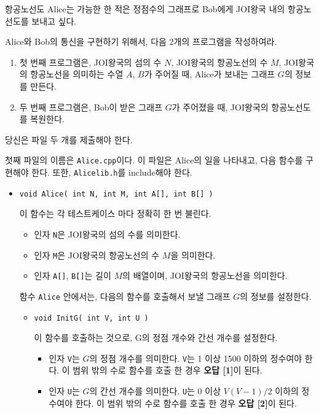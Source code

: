\begin{problem}{항공노선도}
	Alice는 가능한 한 적은 정점수의 그래프로 Bob에게 JOI왕국 내의 항공노선도를 보내고 싶다.
	
	Alice와 Bob의 통신을 구현하기 위해서, 다음 2개의 프로그램을 작성하여라.
	
	\begin{enumerate}
		\item 첫 번째 프로그램은, JOI왕국의 섬의 수 $N$, JOI왕국의 항공노선의 수 $M$, JOI왕국의 항공노선을 의미하는 수열 $A$, $B$가 주어질 때, Alice가 보내는 그래프 $G$의 정보를 만든다.
		\item 두 번째 프로그램은, Bob이 받은 그래프 $G$가 주어졌을 때, JOI왕국의 항공노선도를 복원한다. 
	\end{enumerate}

\Specification

당신은 파일 두 개를 제출해야 한다.

첫째 파일의 이름은 \texttt{Alice.cpp}이다. 이 파일은 Alice의 일을 나타내고, 다음 함수를 구현해야 한다. 또한, \texttt{Alicelib.h}를 include해야 한다.

\begin{itemize}
	\item \texttt{void Alice( int N, int M, int A[], int B[] )}
	
	이 함수는 각 테스트케이스 마다 정확히 한 번 불린다.
	
	\begin{itemize}
		\item 인자 \texttt{N}은 JOI왕국의 섬의 수를 의미한다.
		\item 인자 \texttt{M}은 JOI왕국의 항공노선의 수 $M$을 의미한다.
		\item 인자 \texttt{A[]}, \texttt{B[]}는 길이 $M$의 배열이며, JOI왕국의 항공노선을 의미한다.
	\end{itemize}
	
	함수 \texttt{Alice} 안에서는, 다음의 함수를 호출해서 보낼 그래프 $G$의 정보를 설정한다.
	\begin{itemize}
	\item \texttt{void InitG( int V, int U )}
	
	이 함수를 호출하는 것으로, G의 정점 개수와 간선 개수를 설정한다.
	
	\begin{itemize}
		\item 인자 \texttt{V}는 $G$의 정점 개수를 의미한다. \texttt{V}는 1 이상 1500 이하의 정수여야 한다. 이 범위 밖의 수로 함수를 호출 한 경우 \textbf{오답 [1]}이 된다.
		\item 인자 \texttt{U}는 $G$의 간선 개수를 의미한다. \texttt{U}는 0 이상 $V(V-1)/2$ 이하의 정수여야 한다. 이 범위 밖의 수로 함수를 호출 한 경우 \textbf{오답 [2]}이 된다.
	\end{itemize}


\end{itemize}
\end{itemize}
\end{problem}
